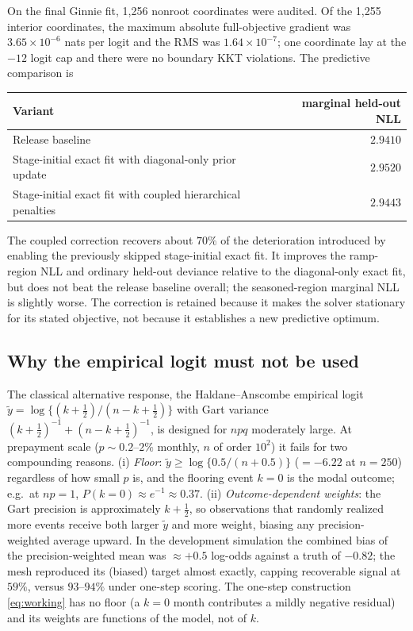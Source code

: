 \documentclass[11pt]{article}
\begin{document}
On the final Ginnie fit, 1,256 nonroot coordinates were audited. Of the 1,255 interior coordinates,
the maximum absolute full-objective gradient was $3.65\times10^{-6}$ nats per logit and the RMS was
$1.64\times10^{-7}$; one coordinate lay at the $-12$ logit cap and there were no boundary KKT
violations. The predictive comparison is
\begin{center}
\begin{tabular}{@{}lr@{}}
\toprule
Variant & marginal held-out NLL\\
\midrule
Release baseline & $2.9410$\\
Stage-initial exact fit with diagonal-only prior update & $2.9520$\\
Stage-initial exact fit with coupled hierarchical penalties & $2.9443$\\
\bottomrule
\end{tabular}
\end{center}
The coupled correction recovers about $70\%$ of the deterioration introduced by enabling the
previously skipped stage-initial exact fit. It improves the ramp-region NLL and ordinary held-out
deviance relative to the diagonal-only exact fit, but does not beat the release baseline overall;
the seasoned-region marginal NLL is slightly worse. The correction is retained because it makes the
solver stationary for its stated objective, not because it establishes a new predictive optimum.

\subsection{Why the empirical logit must not be used}\label{sec:empiricallogit}
The classical alternative response, the Haldane--Anscombe empirical logit
$\tilde y=\log\{(k+\tfrac12)/(n-k+\tfrac12)\}$ with Gart variance
$(k+\tfrac12)^{-1}+(n-k+\tfrac12)^{-1}$, is designed for $npq$ moderately large. At
prepayment scale ($p\sim 0.2$--$2\%$ monthly, $n$ of order $10^2$) it fails for two
compounding reasons. (i) \emph{Floor}: $\tilde y\ge \log\{0.5/(n+0.5)\}$
($=-6.22$ at $n=250$) regardless of how small $p$ is, and the flooring event $k=0$ is
the modal outcome; e.g.\ at $np=1$, $P(k{=}0)\approx e^{-1}\approx 0.37$. (ii)
\emph{Outcome-dependent weights}: the Gart precision is approximately $k+\tfrac12$, so
observations that randomly realized more events receive both larger $\tilde y$ and more
weight, biasing any precision-weighted average upward. In the development simulation the
combined bias of the precision-weighted mean was $\approx +0.5$ log-odds against a truth
of $-0.82$; the mesh reproduced its (biased) target almost exactly, capping recoverable
signal at $59\%$, versus $93$--$94\%$ under one-step scoring. The one-step construction
\eqref{eq:working} has no floor (a $k=0$ month contributes a mildly negative residual)
and its weights are functions of the model, not of $k$.
\end{document}
